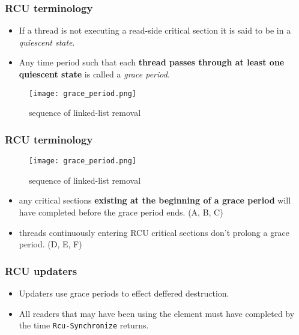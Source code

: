 \documentclass{beamer}
\begin{document}

\begin{frame}[t]
  \frametitle{RCU terminology}

  \begin{itemize}
  \item If a thread is not executing a read-side critical section it is said to be
    in a \emph{quiescent state}.
  \item Any time period such that each \textbf{thread passes through at least
    one quiescent state} is called a \emph{grace period}.
  \end{itemize}
  
  \begin{figure}[ht]
    \centering
    \texttt{[image: grace\_period.png]}
    \caption{sequence of linked-list removal}
  \end{figure}

\end{frame}


\begin{frame}[t]
  \frametitle{RCU terminology}

  \begin{figure}[ht]
    \centering
    \texttt{[image: grace\_period.png]}
    \caption{sequence of linked-list removal}
  \end{figure}

  \begin{itemize}
  \item any critical sections \textbf{existing at the beginning of a grace period}
    will have completed before the grace period ends. (A, B, C)
  \item threads continuously entering RCU critical sections don't prolong a grace period.
    (D, E, F)
  \end{itemize}
  
\end{frame}


\begin{frame}[t]
  \frametitle{RCU updaters}
  
  \begin{itemize}
  \item Updaters use grace periods to effect deffered destruction.
  \item All readers that may have been using the element must have completed
    by the time \texttt{Rcu-Synchronize} returns.
  \end{itemize}

\end{frame}
\end{document}
